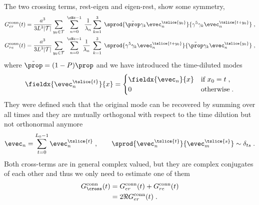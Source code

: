 The two crossing terms, rest-eigen and eigen-rest, show some symmetry,
\begin{align}
G_{er}^{\text{conn}}(t) &=
\frac{a^{3}}{3 L^{3} \lvert \mathcal{T} \rvert}
\sum_{y_0 \in \mathcal{T}} \;
\sum_{n=0}^{\cNc-1} \; \frac{1}{\lambda_{n}}
\sum_{k=1}^{3} \;
\sprod{
  \tilde{\prop}
  \gamma_k
  \evec_{n}^{\tslice{y_0}}
}{
  \gamma^{5}
  \gamma_k
  \evec_{n}^{\tslice{t+y_0}}
} \;, \\
G_{re}^{\text{conn}}(t) &=
\frac{a^{3}}{3 L^{3} \lvert \mathcal{T} \rvert}
\sum_{y_0 \in \mathcal{T}} \;
\sum_{n=0}^{\cNc-1} \frac{1}{\lambda_{n}} \;
\sum_{k=1}^{3} \;
\sprod{
  \gamma^{5}
  \gamma_k
  \evec_{n}^{\tslice{t+y_0}}
}{
  \tilde{\prop}
  \gamma_k
  \evec_{n}^{\tslice{y_0}}
} \;,
\end{align}
where $\tilde{\prop} = (1-P) \prop$ and we have introduced the time-diluted modes
\begin{equation}
\fieldx{\evec_{n}^{\tslice{t}}}{x} =
\begin{cases}
  \fieldx{\evec_{n}}{x} & \text{if } x_0 = t \;, \\
  0 & \text{otherwise} \;.
\end{cases} 
\end{equation}
They were defined such that the original mode can be recovered by summing over all times and they are mutually orthogonal with respect to the time dilution but not orthonormal anymore
\begin{equation}
\evec_{n} = \sum_{t=0}^{L_0-1} \evec_{n}^{\tslice{t}} \;,
\qquad
\sprod{\evec_{n}^{\tslice{t}}}{\evec_{m}^{\tslice{s}}} \sim \delta_{ts} \;. %
\end{equation}
Both cross-terms are in general complex valued, but they are complex conjugates of each other and thus we only need to estimate one of them
\begin{align}
G_{\cross}^{\text{conn}}(t)
&= G_{er}^{\text{conn}}(t) + G_{re}^{\text{conn}}(t) \\
&= 2 \Re{G_{er}^{\text{conn}}(t)} \;.
\end{align}

